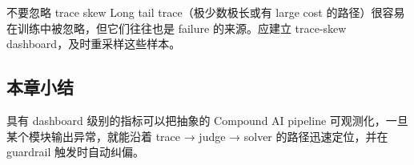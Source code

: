 \begin{warningbox}{不要忽略 trace skew}
Long tail trace（极少数极长或有 large cost 的路径）很容易在训练中被忽略，但它们往往也是 failure 的来源。应建立 trace-skew dashboard，及时重采样这些样本。
\end{warningbox}

\subsection{本章小结}

具有 dashboard 级别的指标可以把抽象的 Compound AI pipeline 可观测化，一旦某个模块输出异常，就能沿着 trace → judge → solver 的路径迅速定位，并在 guardrail 触发时自动纠偏。

